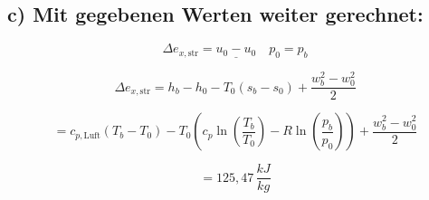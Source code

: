 \subsection*{c) Mit gegebenen Werten weiter gerechnet:}

\[
\Delta e_{x,\text{str}} = \underline{u_0 - u_0} \quad p_0 = p_b
\]

\[
\Delta e_{x,\text{str}} = h_b - h_0 - T_0 \left( s_b - s_0 \right) + \frac{w_b^2 - w_0^2}{2}
\]

\[
= c_{p,\text{Luft}} \left( T_b - T_0 \right) - T_0 \left( c_p \ln \left( \frac{T_b}{T_0} \right) - R \ln \left( \frac{p_b}{p_0} \right) \right) + \frac{w_b^2 - w_0^2}{2}
\]

\[
= 125{,}47 \, \frac{kJ}{kg}
\]